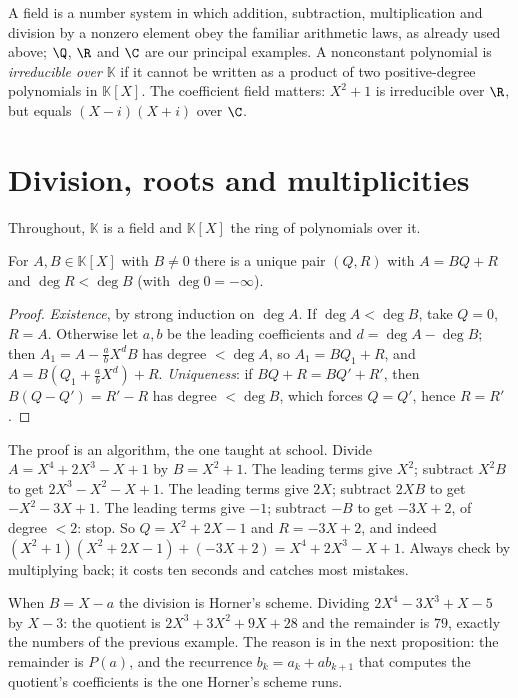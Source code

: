 A field is a number system in which addition, subtraction, multiplication and division by a nonzero element obey the familiar arithmetic laws, as already used above; $\Q$, $\R$ and $\C$ are our principal examples. A nonconstant polynomial is \emph{irreducible over} $\mathbb K$ if it cannot be written as a product of two positive-degree polynomials in $\mathbb K[X]$. The coefficient field matters: $X^2+1$ is irreducible over $\R$, but equals $(X-i)(X+i)$ over $\C$.

\section{Division, roots and multiplicities}

Throughout, $\mathbb K$ is a field and $\mathbb K[X]$ the ring of polynomials over it.

\begin{proposition}\label{prop:polydiv}
For $A,B\in\mathbb K[X]$ with $B\ne0$ there is a unique pair $(Q,R)$ with $A=BQ+R$ and $\deg R<\deg B$ (with $\deg0=-\infty$).
\end{proposition}
\begin{proof}
\emph{Existence}, by strong induction on $\deg A$. If $\deg A<\deg B$, take $Q=0$, $R=A$. Otherwise let $a,b$ be the leading coefficients and $d=\deg A-\deg B$; then $A_1=A-\frac abX^dB$ has degree $<\deg A$, so $A_1=BQ_1+R$, and $A=B\left(Q_1+\frac abX^d\right)+R$.
\emph{Uniqueness}: if $BQ+R=BQ'+R'$, then $B(Q-Q')=R'-R$ has degree $<\deg B$, which forces $Q=Q'$, hence $R=R'$.
\end{proof}

\begin{examplex}
The proof is an algorithm, the one taught at school. Divide $A=X^4+2X^3-X+1$ by $B=X^2+1$. The leading terms give $X^2$; subtract $X^2B$ to
get $2X^3-X^2-X+1$. The leading terms give $2X$; subtract $2XB$ to get $-X^2-3X+1$. The leading terms give $-1$; subtract $-B$ to get $-3X+2$,
of degree $<2$: stop. So $Q=X^2+2X-1$ and $R=-3X+2$, and indeed $(X^2+1)(X^2+2X-1)+(-3X+2)=X^4+2X^3-X+1$. Always check by multiplying back; it costs
ten seconds and catches most mistakes.

When $B=X-a$ the division is Horner's scheme. Dividing $2X^4-3X^3+X-5$ by $X-3$: the quotient is $2X^3+3X^2+9X+28$ and the remainder is $79$,
exactly the numbers of the previous example. The reason is in the next proposition: the remainder is $P(a)$, and the recurrence
$b_k=a_k+ab_{k+1}$ that computes the quotient's coefficients is the one Horner's scheme runs.
\end{examplex}

